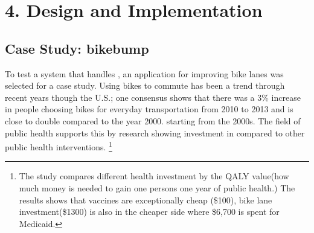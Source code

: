 \chapter{4. Design and Implementation}

\section{Case Study: bikebump}
To test a system that handles , an application for improving bike lanes was selected for a case study. Using bikes to commute has been a trend through recent years though the U.S.;  one consensus shows that there was a 3\% increase in people choosing bikes for everyday transportation from 2010 to 2013 and is close to double compared to the year 2000.\cite{debra2016onemillion}   starting from the 2000s.\cite{sadik2017streetfight} The field of public health supports this by research showing investment in  compared to other public health interventions\cite{gu2016cost}.
\footnote{The study compares different health investment by the QALY value(how much money is needed to gain one persons one year of public health.) The results shows that vaccines are exceptionally cheap (\$100), bike lane investment(\$1300) is also in the cheaper side where \$6,700 is spent for Medicaid.}


